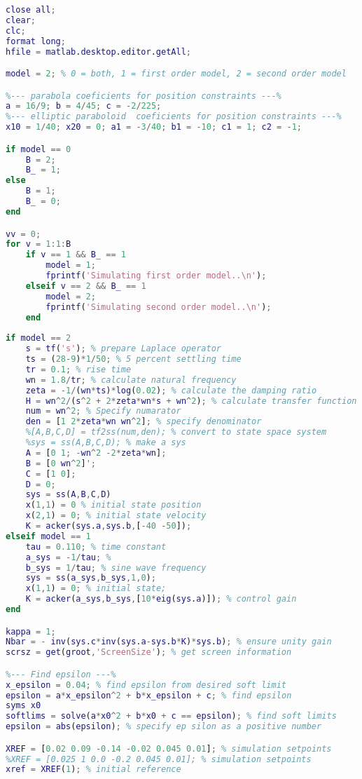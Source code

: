 \begin{lstlisting}[language=matlab]
close all;
clear; 
clc; 
format long;
hfile = matlab.desktop.editor.getAll;

model = 2; % 0 = both, 1 = first order model, 2 = second order model

%--- parabola coeficients for position constraints ---%
a = 16/9; b = 4/45; c = -2/225; 
%--- elliptic paraboloid  coeficients for position constraints ---%
x10 = 1/40; x20 = 0; a1 = -3/40; b1 = -10; c1 = 1; c2 = -1;

if model == 0
    B = 2;
    B_ = 1;
else
    B = 1;
    B_ = 0;
end

vv = 0;
for v = 1:1:B
    if v == 1 && B_ == 1
        model = 1;
        fprintf('Simulating first order model..\n');
    elseif v == 2 && B_ == 1
        model = 2;
        fprintf('Simulating second order model..\n');
    end
    
if model == 2
    s = tf('s'); % prepare Laplace operator
    ts = (28-9)*1/50; % 5 percent settling time
    tr = 0.1; % rise time
    wn = 1.8/tr; % calculate natural frequency
    zeta = -1/(wn*ts)*log(0.02); % calculate the damping ratio
    H = wn^2/(s^2 + 2*zeta*wn*s + wn^2); % calculate transfer function
    num = wn^2; % Specify numarator
    den = [1 2*zeta*wn wn^2]; % specify denominator
    %[A,B,C,D] = tf2ss(num,den); % convert to state space system
    %sys = ss(A,B,C,D); % make a sys
    A = [0 1; -wn^2 -2*zeta*wn];
    B = [0 wn^2]';
    C = [1 0];
    D = 0;
    sys = ss(A,B,C,D)
    x(1,1) = 0 % initial state position
    x(2,1) = 0; % initial state velocity
    K = acker(sys.a,sys.b,[-40 -50]);
elseif model == 1
    tau = 0.110; % time constant
    a_sys = -1/tau; %
    b_sys = 1/tau; % sine wave frequency
    sys = ss(a_sys,b_sys,1,0);
    x(1,1) = 0; % initial state;
    K = acker(a_sys,b_sys,[10*eig(sys.a)]); % control gain   
end

kappa = 1;
Nbar = - inv(sys.c*inv(sys.a-sys.b*K)*sys.b); % ensure unity gain
scrsz = get(groot,'ScreenSize'); % get screen information

%--- Find epsilon ---%
x_epsilon = 0.04; % find epsilon from desired soft limit
epsilon = a*x_epsilon^2 + b*x_epsilon + c; % find epsilon
syms x0
softlims = solve(a*x0^2 + b*x0 + c == epsilon); % find soft limits
epsilon = abs(epsilon); % specify ep silon as a positive number

XREF = [0.02 0.09 -0.14 -0.02 0.045 0.01]; % simulation setpoints
%XREF = [0.025 1 0.0 -0.2 0.045 0.01]; % simulation setpoints
xref = XREF(1); % initial reference


\end{lstlisting}
